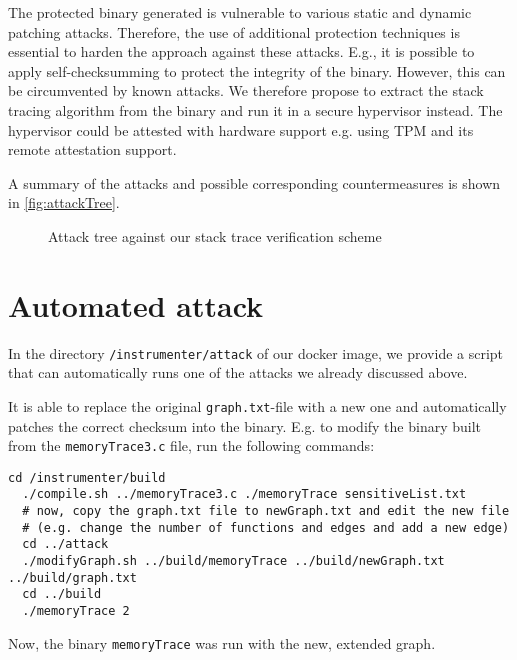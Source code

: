 \documentclass{llncs}
\begin{document}
The protected binary generated is vulnerable to various static and dynamic patching attacks. Therefore, the use of additional protection techniques is essential to harden the approach against these attacks. E.g., it is possible to apply self-checksumming to protect the integrity of the binary. However, this can be circumvented by known attacks. We therefore propose to extract the stack tracing algorithm from the binary and run it in a secure hypervisor instead. The hypervisor could be attested with hardware support e.g. using TPM and its remote attestation support.

A summary of the attacks and possible corresponding countermeasures is shown in \autoref{fig:attackTree}.
\begin{figure}[htb]
\hspace*{-2cm} \scalebox{.6}{
\begin{forest}
[Authenticate Caller, proTree
  [Static Patching
    [Change response\\
mechanism, proTree]
    [Remove Stack\\
Verification, proTree]
    [Introspection, oppTree]
  ]
  [Dynamic Patching
    [Instrument Stack\\
Verification]
    [Jump after shadow\\
stack building function]
  ]
  [Modify Reference\\
Call Graph
    [Find Digest
      [White-Box\\
Crypto, oppTree]
    ]
  ]
]
\end{forest}}
\caption{Attack tree against our stack trace verification scheme}
\label{fig:attackTree}
\end{figure}

\section{Automated attack}
In the directory \texttt{/instrumenter/attack} of our docker image, we provide a script that can automatically runs one of the attacks we already discussed above.

It is able to replace the original \texttt{graph.txt}-file with a new one and automatically patches the correct checksum into the binary. E.g. to modify the binary built from the \texttt{memoryTrace3.c} file, run the following commands:
\begin{lstlisting}[basicstyle=\scriptsize]
  cd /instrumenter/build
  ./compile.sh ../memoryTrace3.c ./memoryTrace sensitiveList.txt
  # now, copy the graph.txt file to newGraph.txt and edit the new file
  # (e.g. change the number of functions and edges and add a new edge)
  cd ../attack
  ./modifyGraph.sh ../build/memoryTrace ../build/newGraph.txt ../build/graph.txt
  cd ../build
  ./memoryTrace 2
\end{lstlisting}
Now, the binary \texttt{memoryTrace} was run with the new, extended graph.
\end{document}
